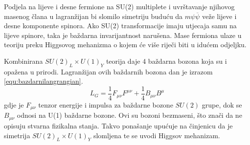 \documentclass[a4paper,12pt]{report}
\begin{document}
Podjela na lijeve i desne fermione na SU(2) multiplete i uvrštavanje njihovog masenog člana u lagranžijan bi slomilo simetriju buduću da $m \psi \overline{\psi}$ veže lijeve i desne komponente spinora. Ako SU(2) transformacije imaju utjecaja samu na lijeve spinore, taka je baždarna invarijantnost narušena. Mase fermiona ulaze u teoriju preku Higgsovog mehanizma o kojem će više riječi biti u idućem odjeljku.
                                                                                                     
Kombinirana $SU(2)_L \times U(1)_Y$ teorija daje 4 baždarna bozona koja su i opažena u prirodi. Lagranžijan ovih baždarnih bozona dan je izrazom \ref{equ:bazdarnilangrangian}.
\begin{equation}
 L_G=\frac{1}{4} F_{\mu\nu}F^{\mu\nu} + \frac{1}{4}B_{\mu\nu}B^{\mu}
\end{equation}
gdje je $F_{\mu\nu}$ tenzor energije i impulsa za baždarne bozone $SU(2)$ grupe, dok se $B_{\mu\nu}$ odnosi na U(1) baždarne bozone. Ovi su bozoni bezmaseni, što znači da ne opisuju stvarna fizikalna stanja. Takvo ponašanje upućuje na činjenicu da je simetrija $SU(2)_L \times U(1)_Y$ slomljena te se uvodi Higgsov mehanizam.
\end{document}
